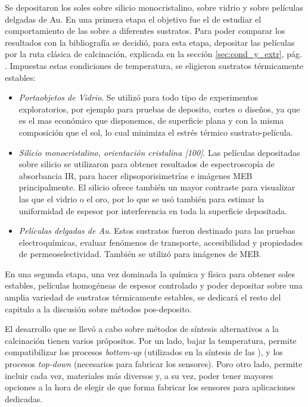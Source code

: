 	Se depositaron los soles sobre silicio monocristalino, sobre vidrio y sobre películas delgadas de Au. En una primera etapa el objetivo fue el de estudiar el comportamiento de las \pdm\space sobre a diferentes sustratos. Para poder comparar los resultados con la bibliografía\cite{Soler-Illia2006,Brinker1990} se decidió, para esta etapa, depositar las películas por la ruta clásica de calcinación, explicada en la sección \ref{sec:cond_y_extr}, pág. \pageref{sec:cond_y_extr}. Impuestas estas condiciones de temperatura, se eligieron sustratos térmicamente estables:

		\begin{itemize}

			\item \textit{Portaobjetos de Vidrio}. Se utilizó para todo tipo de experimentos exploratorios, por ejemplo para pruebas de deposito, cortes o diseños, ya que es el mas económico que disponemos, de superficie plana y con la misma composición que el sol, lo cual minimiza el estrés térmico sustrato-película.

			\item \textit{Silicio monocristalino, orientación cristalina [100]}. Las películas depositadas sobre silicio se utilizaron para obtener resultados de espectroscopía de absorbancia IR, para hacer elipsoporisimetrías e imágenes MEB principalmente. El silicio ofrece también un mayor contraste para visualizar las \pdm\space que el vidrio o el oro, por lo que se usó también para estimar la uniformidad de espesor por interferencia en toda la superficie depositada.
		
			\item \textit{Películas delgadas de Au}. Estos sustratos fueron destinado para las pruebas electroquímicas, evaluar fenómenos de transporte, accesibilidad y propiedades de permeoselectividad. También se utilizó para imágenes de MEB.

			\end{itemize}
	
	En una segunda etapa, una vez dominada la química y física para obtener soles estables, películas homogéneas de espesor controlado y poder depositar sobre una amplia variedad de sustratos térmicamente estables, se dedicará el resto del capitulo a la discusión sobre métodos pos-deposito. 

	El desarrollo que se llevó a cabo sobre métodos de síntesis alternativos a la calcinación tienen varios própositos. 
	Por un lado, bajar la temperatura, permite compatibilizar los procesos \textit{bottom-up} (utilizados en la síntesis de las \pdm), y los procesos \textit{top-down} (necesarios para fabricar los sensores). Poro otro lado, permite incluir cada vez, materiales más diversos y, a su vez, poder tener mayores opciones a la hora de elegir de que forma fabricar los sensores para aplicaciones dedicadas\cite{Doshi2000a,Wagner2013,Innocenzi2013,Soler-Illia2002a}.

